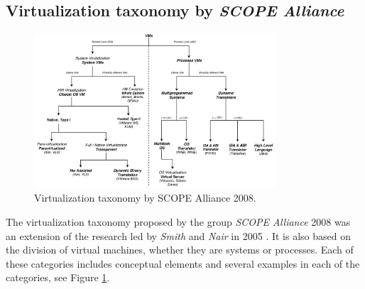 	\subsection{Virtualization taxonomy by \textit{SCOPE Alliance}}
	
	\begin{figure}[!hbtp]
		\centering
		\includegraphics[width=9cm]{images/ScopeAlliance2008.pdf}
		\vspace{-0.2cm}
		\caption{Virtualization taxonomy by SCOPE Alliance 2008\footnotemark[5]{}.}
		\label{fig:TaxonomyVirtualizationSCOPEAlliance2008}
	\end{figure}
	
	
	The virtualization taxonomy proposed by the group \textit{SCOPE Alliance} 2008 \cite{SCOPEAlliance2008} was an extension of the research led by \textit{Smith} and \textit{Nair} in 2005 \cite{Smith2005}. It is also based on the division of virtual machines, whether they are systems or processes. Each of these categories includes conceptual elements and several examples in each of the categories, see Figure \ref{fig:TaxonomyVirtualizationSCOPEAlliance2008}. 
	
	
	
